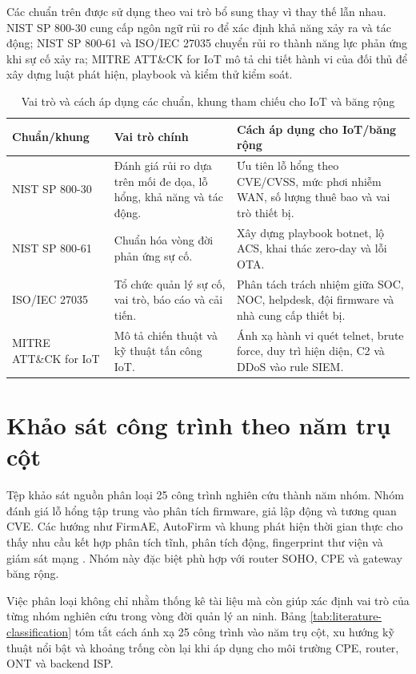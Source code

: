 \documentclass[../DoAn.tex]{subfiles}
\begin{document}
Các chuẩn trên được sử dụng theo vai trò bổ sung thay vì thay thế lẫn nhau. NIST SP 800-30 cung cấp ngôn ngữ rủi ro để xác định khả năng xảy ra và tác động; NIST SP 800-61 và ISO/IEC 27035 chuyển rủi ro thành năng lực phản ứng khi sự cố xảy ra; MITRE ATT\&CK for IoT mô tả chi tiết hành vi của đối thủ để xây dựng luật phát hiện, playbook và kiểm thử kiểm soát.

\begin{table}[htbp]
\centering
\begin{tabular}{|p{3.1cm}|p{4.5cm}|p{5.2cm}|}
\hline
\textbf{Chuẩn/khung} & \textbf{Vai trò chính} & \textbf{Cách áp dụng cho IoT/băng rộng} \\ \hline
NIST SP 800-30 & Đánh giá rủi ro dựa trên mối đe dọa, lỗ hổng, khả năng và tác động. & Ưu tiên lỗ hổng theo CVE/CVSS, mức phơi nhiễm WAN, số lượng thuê bao và vai trò thiết bị. \\ \hline
NIST SP 800-61 & Chuẩn hóa vòng đời phản ứng sự cố. & Xây dựng playbook botnet, lộ ACS, khai thác zero-day và lỗi OTA. \\ \hline
ISO/IEC 27035 & Tổ chức quản lý sự cố, vai trò, báo cáo và cải tiến. & Phân tách trách nhiệm giữa SOC, NOC, helpdesk, đội firmware và nhà cung cấp thiết bị. \\ \hline
MITRE ATT\&CK for IoT & Mô tả chiến thuật và kỹ thuật tấn công IoT. & Ánh xạ hành vi quét telnet, brute force, duy trì hiện diện, C2 và DDoS vào rule SIEM. \\ \hline
\end{tabular}
\caption{Vai trò và cách áp dụng các chuẩn, khung tham chiếu cho IoT và băng rộng}
\label{tab:security-standards-frameworks}
\end{table}

\section{Khảo sát công trình theo năm trụ cột}
Tệp khảo sát nguồn phân loại 25 công trình nghiên cứu thành năm nhóm. Nhóm đánh giá lỗ hổng tập trung vào phân tích firmware, giả lập động và tương quan CVE. Các hướng như FirmAE, AutoFirm và khung phát hiện thời gian thực cho thấy nhu cầu kết hợp phân tích tĩnh, phân tích động, fingerprint thư viện và giám sát mạng \cite{kim2020firmae,autofirm2024,hybridcve2024}. Nhóm này đặc biệt phù hợp với router SOHO, CPE và gateway băng rộng.

Việc phân loại không chỉ nhằm thống kê tài liệu mà còn giúp xác định vai trò của từng nhóm nghiên cứu trong vòng đời quản lý an ninh. Bảng \ref{tab:literature-classification} tóm tắt cách ánh xạ 25 công trình vào năm trụ cột, xu hướng kỹ thuật nổi bật và khoảng trống còn lại khi áp dụng cho môi trường CPE, router, ONT và backend ISP.
\end{document}
